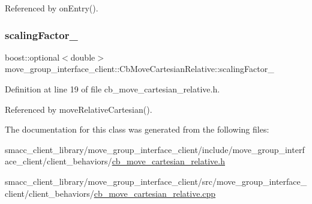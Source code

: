Referenced by on\+Entry().

\mbox{\label{classmove__group__interface__client_1_1CbMoveCartesianRelative_a62cdf88c437312ac79c8acc01519d634}} 
\subsubsection{\texorpdfstring{scaling\+Factor\+\_\+}{scalingFactor\_}}
{\footnotesize\ttfamily boost\+::optional$<$double$>$ move\+\_\+group\+\_\+interface\+\_\+client\+::\+Cb\+Move\+Cartesian\+Relative\+::scaling\+Factor\+\_\+}



Definition at line 19 of file cb\+\_\+move\+\_\+cartesian\+\_\+relative.\+h.



Referenced by move\+Relative\+Cartesian().



The documentation for this class was generated from the following files\+:\begin{DoxyCompactItemize}
\item 
smacc\+\_\+client\+\_\+library/move\+\_\+group\+\_\+interface\+\_\+client/include/move\+\_\+group\+\_\+interface\+\_\+client/client\+\_\+behaviors/\hyperlink{cb__move__cartesian__relative_8h}{cb\+\_\+move\+\_\+cartesian\+\_\+relative.\+h}\item 
smacc\+\_\+client\+\_\+library/move\+\_\+group\+\_\+interface\+\_\+client/src/move\+\_\+group\+\_\+interface\+\_\+client/client\+\_\+behaviors/\hyperlink{cb__move__cartesian__relative_8cpp}{cb\+\_\+move\+\_\+cartesian\+\_\+relative.\+cpp}\end{DoxyCompactItemize}
